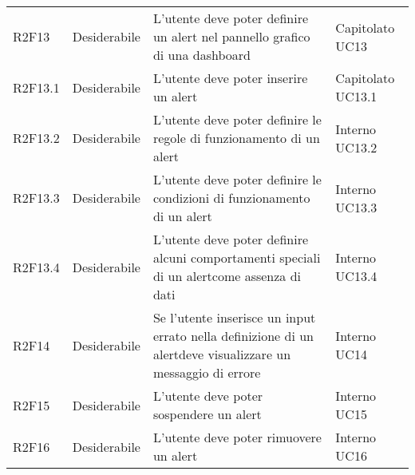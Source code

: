 \begin{longtable} {
		>{}p{24mm} 
		>{}p{32mm}
		>{}p{40mm} 
		>{}p{24.5mm}
		}
			R2F13 &	Desiderabile & L'utente deve poter definire un alert nel pannello grafico di una dashboard\glo & Capitolato UC13 \TBstrut \\ [2mm]			
		R2F13.1 & Desiderabile & L'utente deve poter inserire un alert & Capitolato UC13.1 \TBstrut \\ [2mm]		
		R2F13.2 & Desiderabile & L'utente deve poter definire le regole di funzionamento di un alert\glo & Interno UC13.2 \TBstrut \\ [2mm]		
		R2F13.3 & Desiderabile & L'utente deve poter definire le condizioni di funzionamento di un alert\glo & Interno UC13.3 \TBstrut \\ [2mm]
		R2F13.4 & Desiderabile & L'utente deve poter definire alcuni comportamenti speciali di un alert\glo come assenza di dati & Interno UC13.4 \TBstrut \\ [2mm]		
		R2F14 &	Desiderabile & Se l'utente inserisce un input errato nella definizione di un alert\glosp deve visualizzare un messaggio di errore &	Interno UC14 \TBstrut \\ [2mm]
		R2F15 &	Desiderabile & L'utente deve poter sospendere un alert\glo & Interno UC15 \TBstrut \\ [2mm]		
		R2F16 & Desiderabile & L'utente deve poter rimuovere un alert\glo & Interno UC16 \TBstrut \\ [2mm]	
	\end{longtable}